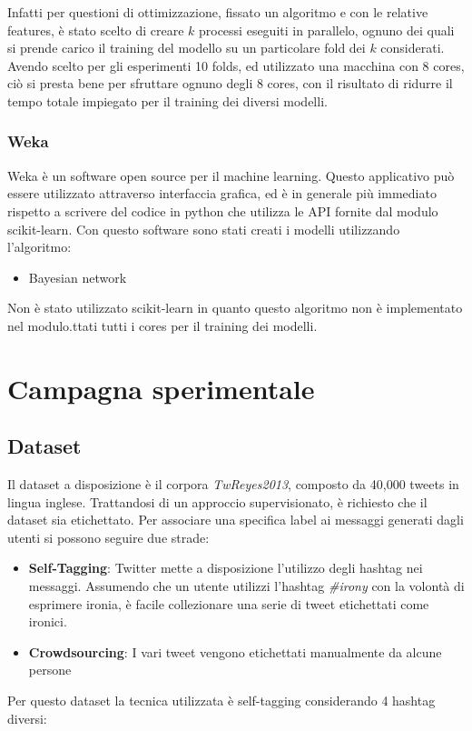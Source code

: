 \documentclass[oneside]{book}
\begin{document}
Infatti per questioni di ottimizzazione, fissato un algoritmo e con le relative features, è stato scelto di creare $k$ processi eseguiti in parallelo, ognuno dei quali si prende carico il training del modello su un particolare fold dei $k$ considerati. Avendo scelto per gli esperimenti 10 folds, ed utilizzato una macchina con 8 cores, ciò si presta bene per sfruttare ognuno degli 8 cores, con il risultato di ridurre il tempo totale impiegato per il training dei diversi modelli.

\subsection{Weka}

Weka\cite{weka} è un software open source per il machine learning. Questo applicativo può essere utilizzato attraverso interfaccia grafica, ed è in generale più immediato rispetto a scrivere del codice in python che utilizza le API fornite dal modulo scikit-learn. Con questo software sono stati creati i modelli utilizzando l'algoritmo:
\begin{itemize}
	\item Bayesian network
\end{itemize}
Non è stato utilizzato scikit-learn in quanto questo algoritmo non è implementato nel modulo.ttati tutti i cores per il training dei modelli.

\chapter{Campagna sperimentale}

\section{Dataset}
Il dataset a disposizione è il corpora \emph{TwReyes2013}, composto da 40,000 tweets in lingua inglese. Trattandosi di un approccio supervisionato, è richiesto che il dataset sia etichettato. Per associare una specifica label ai messaggi generati dagli utenti si possono seguire due strade:

\begin{itemize}
	\item \textbf{Self-Tagging}:
	\label{chap:self-taggin}
	Twitter mette a disposizione l'utilizzo degli hashtag nei messaggi. Assumendo che un utente utilizzi l'hashtag \emph{\#irony} con la volontà di esprimere ironia, è facile collezionare una serie di tweet etichettati come ironici.
	
	\item \textbf{Crowdsourcing}:	
	I vari tweet vengono etichettati manualmente da alcune persone
\end{itemize}
Per questo dataset la tecnica utilizzata è self-tagging considerando 4 hashtag diversi:
\end{document}
